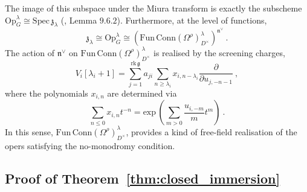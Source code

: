 \documentclass[a4paper]{article}
\def\gf{\mathfrak{g}}
\def \zf{\mathfrak{z}}
\def \Op{\mathrm{Op}}
\begin{document}
The image of this subspace under the Miura transform is exactly the subscheme $\Op_G^{\lambda}\cong \mathrm{Spec}\,\zf_\lambda$ (\cite{Frenkel:2007}, Lemma $9.6.2$). Furthermore, at the level of functions,
\begin{equation}
	\zf_\lambda \cong \Op_G^\lambda \cong (\mathrm{Fun\, Conn}(\Omega^\rho)_{D^\times}^\lambda )^{\mathfrak{n}^\vee}~.
\end{equation}
The action of $\mathfrak{n}^\vee$ on $\mathrm{Fun\, Conn}(\Omega^\rho)_{D^\times}^\lambda$ is realised by the screening charges,
\begin{equation}
	V_i[\lambda_i +1] = \sum_{j=1}^{\mathrm{rk}\,\gf}a_{ji} \sum _{n\ge\lambda_i} x_{i,n-\lambda_i} \frac{\partial}{\partial u_{j,-n-1}}~,
\end{equation}
where the polynomials $x_{i,n}$ are determined via
\begin{equation}
	\sum_{n \le 0} x_{i,n}t^{-n} = \mathrm{exp}\, \left( \sum_{m>0} \frac{u_{i,-m}}{m} t^m \right)~.
\end{equation}
In this sense, $\mathrm{Fun\, Conn}(\Omega^\rho)_{D^\times}^\lambda$, provides a kind of free-field realisation of the opers satisfying the no-monodromy condition.

\subsection{Proof of Theorem~\ref{thm:closed_immersion}}
\end{document}
